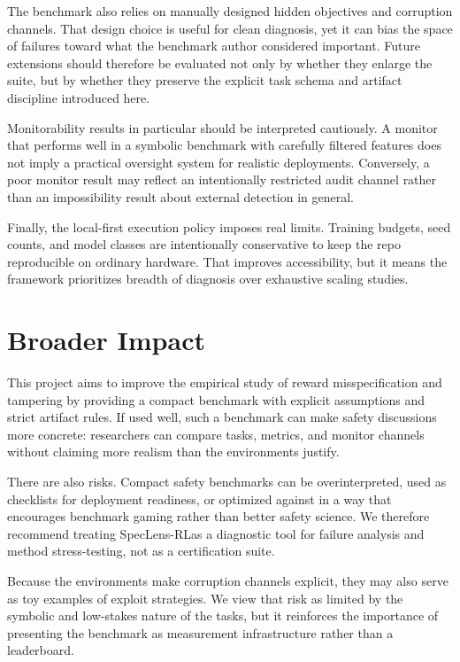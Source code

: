 \documentclass[10pt,twocolumn,letterpaper]{article}
\newcommand{\framework}{SpecLens-RL}
\begin{document}
The benchmark also relies on manually designed hidden objectives and corruption
channels. That design choice is useful for clean diagnosis, yet it can bias the
space of failures toward what the benchmark author considered important. Future
extensions should therefore be evaluated not only by whether they enlarge the
suite, but by whether they preserve the explicit task schema and artifact
discipline introduced here.

Monitorability results in particular should be interpreted cautiously. A monitor
that performs well in a symbolic benchmark with carefully filtered features does
not imply a practical oversight system for realistic deployments. Conversely, a
poor monitor result may reflect an intentionally restricted audit channel rather
than an impossibility result about external detection in general.

Finally, the local-first execution policy imposes real limits. Training budgets,
seed counts, and model classes are intentionally conservative to keep the repo
reproducible on ordinary hardware. That improves accessibility, but it means the
framework prioritizes breadth of diagnosis over exhaustive scaling studies.

\section{Broader Impact}
This project aims to improve the empirical study of reward misspecification and
tampering by providing a compact benchmark with explicit assumptions and strict
artifact rules. If used well, such a benchmark can make safety discussions more
concrete: researchers can compare tasks, metrics, and monitor channels without
claiming more realism than the environments justify.

There are also risks. Compact safety benchmarks can be overinterpreted, used as
checklists for deployment readiness, or optimized against in a way that
encourages benchmark gaming rather than better safety science. We therefore
recommend treating \framework as a diagnostic tool for failure analysis and
method stress-testing, not as a certification suite.

Because the environments make corruption channels explicit, they may also serve
as toy examples of exploit strategies. We view that risk as limited by the
symbolic and low-stakes nature of the tasks, but it reinforces the importance of
presenting the benchmark as measurement infrastructure rather than a leaderboard.
\end{document}
